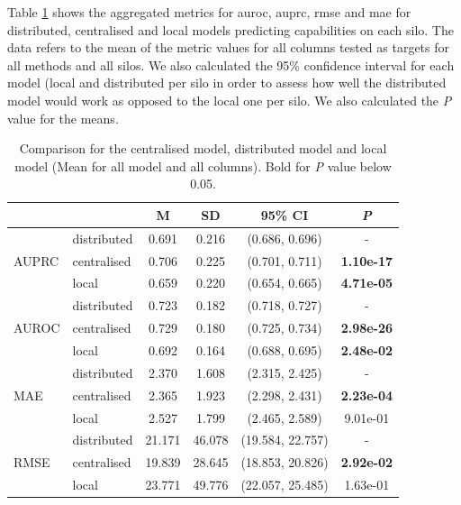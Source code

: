 Table \ref{tab:allvsall} shows the aggregated metrics for \ac{auroc}, \ac{auprc}, \ac{rmse} and \ac{mae} for distributed, centralised and local models predicting capabilities on each silo. The data refers to the mean of the metric values for all columns tested as targets for all methods and all silos. We also calculated the 95\% confidence interval for each model (local and distributed per silo in order to assess how well the distributed model would work as opposed to the local one per silo. We also calculated the \textit{P} value for the means.

\begin{table}[htbp] 
 \setlength{\tabcolsep}{7pt} %
 \renewcommand{\arraystretch}{1.3} %
  \captionsetup{justification=centering} 
\centering
\caption[Metrics for centralised model, distributed model and local model]{Comparison for the centralised model, distributed model and local model (Mean for all model and all columns). Bold for \textit{P} value below 0.05.}
\label{tab:allvsall}
\begin{tabular}{llcccc}
\toprule
 &  & M & SD & 95\% CI & \textit{P}  \\
\midrule
\multirow[t]{3}{*}{AUPRC}
 & distributed & 0.691 & 0.216 & (0.686, 0.696) & - \\
  & centralised & 0.706 & 0.225 & (0.701, 0.711) & \bfseries 1.10e-17 \\
 & local & 0.659 & 0.220 & (0.654, 0.665) & \bfseries 4.71e-05 \\
 \hline

\multirow[t]{3}{*}{AUROC} 
 & distributed & 0.723 & 0.182 & (0.718, 0.727) & - \\
 & centralised & 0.729 & 0.180 & (0.725, 0.734) & \bfseries 2.98e-26 \\
 & local & 0.692 & 0.164 & (0.688, 0.695) & \bfseries 2.48e-02 \\

\hline

\multirow[t]{3}{*}{MAE} 
 & distributed & 2.370 & 1.608 & (2.315, 2.425) & - \\
 & centralised & 2.365 & 1.923 & (2.298, 2.431) & \bfseries 2.23e-04 \\
 & local & 2.527 & 1.799 & (2.465, 2.589) & 9.01e-01 \\

\hline

\multirow[t]{3}{*}{RMSE} 
 & distributed & 21.171 & 46.078 & (19.584, 22.757) & - \\
 & centralised & 19.839 & 28.645 & (18.853, 20.826) & \bfseries 2.92e-02 \\
 & local & 23.771 & 49.776 & (22.057, 25.485) & 1.63e-01 \\
\hline
\end{tabular}
\end{table}





